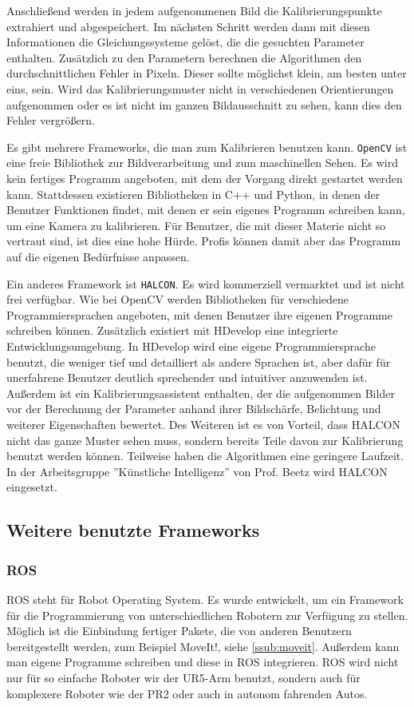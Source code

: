 Anschließend werden in jedem aufgenommenen Bild die Kalibrierungspunkte extrahiert und abgespeichert. Im nächsten Schritt werden dann mit diesen Informationen die Gleichungssysteme gelöst, die die gesuchten Parameter enthalten. Zusätzlich zu den Parametern berechnen die Algorithmen den durchschnittlichen Fehler in Pixeln. Dieser sollte möglichst klein, am besten unter eins, sein. Wird das Kalibrierungsmuster nicht in verschiedenen Orientierungen aufgenommen oder es ist nicht im ganzen Bildausschnitt zu sehen, kann dies den Fehler vergrößern.

Es gibt mehrere Frameworks, die man zum Kalibrieren benutzen kann. \texttt{OpenCV} ist eine freie Bibliothek zur Bildverarbeitung und zum maschinellen Sehen. Es wird kein fertiges Programm angeboten, mit dem der Vorgang direkt gestartet werden kann. Stattdessen existieren Bibliotheken in C++ und Python, in denen der Benutzer Funktionen findet, mit denen er sein eigenes Programm schreiben kann, um eine Kamera zu kalibrieren. Für Benutzer, die mit dieser Materie nicht so vertraut sind, ist dies eine hohe Hürde. Profis können damit aber das Programm auf die eigenen Bedürfnisse anpassen.

Ein anderes Framework ist \texttt{HALCON}. Es wird kommerziell vermarktet und ist nicht frei verfügbar. Wie bei OpenCV werden Bibliotheken für verschiedene Programmiersprachen angeboten, mit denen Benutzer ihre eigenen Programme schreiben können. Zusätzlich existiert mit HDevelop eine integrierte Entwicklungsumgebung. In HDevelop wird eine eigene Programmiersprache benutzt, die weniger tief und detailliert als andere Sprachen ist, aber dafür für unerfahrene Benutzer deutlich sprechender und intuitiver anzuwenden ist. Außerdem ist ein Kalibrierungsassistent enthalten, der die aufgenommen Bilder vor der Berechnung der Parameter anhand ihrer Bildschärfe, Belichtung und weiterer Eigenschaften bewertet. Des Weiteren ist es von Vorteil, dass HALCON nicht das ganze Muster sehen muss, sondern bereits Teile davon zur Kalibrierung benutzt werden können. Teilweise haben die Algorithmen eine geringere Laufzeit. In der Arbeitsgruppe ''Künstliche Intelligenz'' von Prof. Beetz wird HALCON eingesetzt.

\subsection{Weitere benutzte Frameworks} %
\label{sub:weitere_benutzte_frameworks}
\subsubsection{ROS} %
\label{ssub:ros}
ROS \cite{ROS} steht für Robot Operating System. Es wurde entwickelt, um ein Framework für die Programmierung von unterschiedlichen Robotern zur Verfügung zu stellen. Möglich ist die Einbindung fertiger Pakete, die von anderen Benutzern bereitgestellt werden, zum Beispiel MoveIt!, siehe \autoref{ssub:moveit}. Außerdem kann man eigene Programme schreiben und diese in ROS integrieren. ROS wird nicht nur für so einfache Roboter wir der UR5-Arm benutzt, sondern auch für komplexere Roboter wie der PR2 oder auch in autonom fahrenden Autos.

